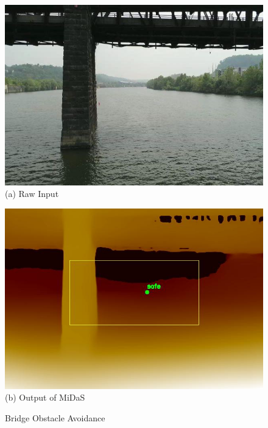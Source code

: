\begin{figure}
\vspace{0.1in}
\begin{minipage}[b]{0.495\linewidth}
\centering
\includegraphics[width=0.95\linewidth]{chapter4/FIGS/fig-bridge-raw.jpg}\\
{\small (a) Raw Input}\\
\end{minipage}
\begin{minipage}[b]{0.495\linewidth}
\centering
\includegraphics[width=0.95\linewidth]{chapter4/FIGS/fig-bridge-midas.jpg}\\
{\small (b) Output of MiDaS}\\
\end{minipage}
\caption{Bridge Obstacle Avoidance}
\label{fig:midas-sample}
\end{figure}


